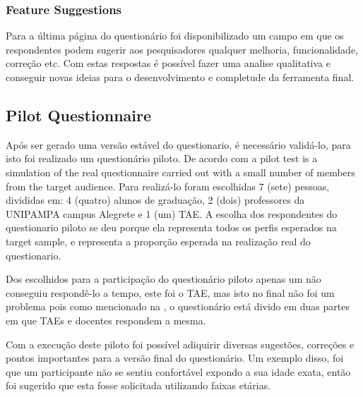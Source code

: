 \subsubsection{Feature Suggestions}
Para a última página do questionário foi disponibilizado um campo em que os respondentes podem sugerir aos pesquisadores qualquer melhoria, funcionalidade, correção etc. Com estas respostas é possível fazer uma analise qualitativa e conseguir novas ideias para o desenvolvimento e completude da ferramenta final.
\subsection{Pilot Questionnaire}\label{sec:survey-pilot}
Após ser gerado uma versão estável do questionario, é necessário validá-lo, para isto foi realizado um questionário piloto. 
De acordo com  a pilot test is a simulation of the real questionnaire carried out with a small number of members from the target audience. 
Para realizá-lo foram escolhidas 7 (sete) pessoas, divididas em: 4 (quatro) alunos de graduação, 2 (dois) professores da \ac{UNIPAMPA} campus Alegrete e 1 (um) \ac{TAE}. 
A escolha dos respondentes do questionario piloto se deu porque ela representa todos os perfis esperados na target sample, e representa a proporção esperada na realização real do questionario.

Dos escolhidos para a participação do questionário piloto apenas um não conseguiu respondê-lo a tempo, este foi o \ac{TAE}, mas isto no final não foi um problema pois como mencionado na , o questionário está divido em duas partes em que \acp{TAE} e docentes respondem a mesma.

Com a execução deste piloto foi possível adiquirir diversas sugestões, correções e pontos importantes para a versão final do questionário. 
Um exemplo disso, foi que um participante não se sentiu confortável expondo a sua idade exata, então foi sugerido que esta fosse solicitada utilizando faixas etárias.
